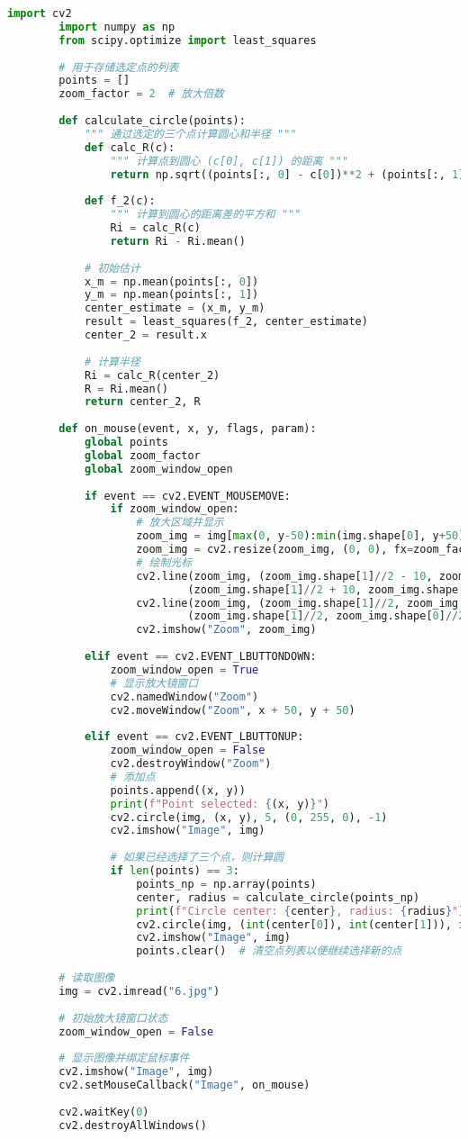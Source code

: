 \documentclass[dvipsnames, svgnames,a4paper,11pt]{article}
\begin{document}
	\begin{lstlisting}[language=Python, caption=测量圆环半径所用的代码]
		import cv2
		import numpy as np
		from scipy.optimize import least_squares
		
		# 用于存储选定点的列表
		points = []
		zoom_factor = 2  # 放大倍数
		
		def calculate_circle(points):
			""" 通过选定的三个点计算圆心和半径 """
			def calc_R(c):
				""" 计算点到圆心 (c[0], c[1]) 的距离 """
				return np.sqrt((points[:, 0] - c[0])**2 + (points[:, 1] - c[1])**2)
		
			def f_2(c):
				""" 计算到圆心的距离差的平方和 """
				Ri = calc_R(c)
				return Ri - Ri.mean()
		
			# 初始估计
			x_m = np.mean(points[:, 0])
			y_m = np.mean(points[:, 1])
			center_estimate = (x_m, y_m)
			result = least_squares(f_2, center_estimate)
			center_2 = result.x
		
			# 计算半径
			Ri = calc_R(center_2)
			R = Ri.mean()
			return center_2, R
		
		def on_mouse(event, x, y, flags, param):
			global points
			global zoom_factor
			global zoom_window_open
		
			if event == cv2.EVENT_MOUSEMOVE:
				if zoom_window_open:
					# 放大区域并显示
					zoom_img = img[max(0, y-50):min(img.shape[0], y+50), max(0, x-50):min(img.shape[1], x+50)]
					zoom_img = cv2.resize(zoom_img, (0, 0), fx=zoom_factor, fy=zoom_factor)
					# 绘制光标
					cv2.line(zoom_img, (zoom_img.shape[1]//2 - 10, zoom_img.shape[0]//2),
							(zoom_img.shape[1]//2 + 10, zoom_img.shape[0]//2), (255, 0, 0), 1)
					cv2.line(zoom_img, (zoom_img.shape[1]//2, zoom_img.shape[0]//2 - 10),
							(zoom_img.shape[1]//2, zoom_img.shape[0]//2 + 10), (255, 0, 0), 1)
					cv2.imshow("Zoom", zoom_img)
		
			elif event == cv2.EVENT_LBUTTONDOWN:
				zoom_window_open = True
				# 显示放大镜窗口
				cv2.namedWindow("Zoom")
				cv2.moveWindow("Zoom", x + 50, y + 50)
		
			elif event == cv2.EVENT_LBUTTONUP:
				zoom_window_open = False
				cv2.destroyWindow("Zoom")
				# 添加点
				points.append((x, y))
				print(f"Point selected: {(x, y)}")
				cv2.circle(img, (x, y), 5, (0, 255, 0), -1)
				cv2.imshow("Image", img)
		
				# 如果已经选择了三个点，则计算圆
				if len(points) == 3:
					points_np = np.array(points)
					center, radius = calculate_circle(points_np)
					print(f"Circle center: {center}, radius: {radius}")
					cv2.circle(img, (int(center[0]), int(center[1])), int(radius), (255, 0, 0), 2)
					cv2.imshow("Image", img)
					points.clear()  # 清空点列表以便继续选择新的点
		
		# 读取图像
		img = cv2.imread("6.jpg")
		
		# 初始放大镜窗口状态
		zoom_window_open = False
		
		# 显示图像并绑定鼠标事件
		cv2.imshow("Image", img)
		cv2.setMouseCallback("Image", on_mouse)
		
		cv2.waitKey(0)
		cv2.destroyAllWindows()
		

	\end{lstlisting}
		
		
\end{document}
